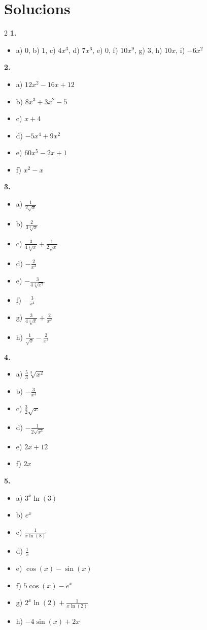 \documentclass[12pt,a4paper]{article}
\begin{document}
\section*{Solucions}
\begin{multicols}{2}
\textbf{1.}
\begin{itemize}[itemsep=0pt]
    \item a) $0$, b) $1$, c) $4x^3$, d) $7x^6$, e) $0$, f) $10x^9$, g) $3$, h) $10x$, i) $-6x^2$
\end{itemize}

\textbf{2.}
\begin{itemize}[itemsep=0pt]
    \item a) $12x^2 - 16x + 12$
    \item b) $8x^3 + 3x^2 - 5$
    \item c) $x + 4$
    \item d) $-5x^4 + 9x^2$
    \item e) $60x^5 - 2x + 1$
    \item f) $x^2 - x$
\end{itemize}

\textbf{3.}
\begin{itemize}[itemsep=0pt]
    \item a) $\frac{1}{2\sqrt{x}}$
    \item b) $\frac{2}{3\sqrt[3]{x}}$
    \item c) $\frac{3}{4\sqrt[4]{x}} + \frac{1}{2\sqrt{x}}$
    \item d) $-\frac{2}{x^3}$
    \item e) $-\frac{3}{4\sqrt[4]{x^7}}$
    \item f) $-\frac{3}{x^4}$
    \item g) $\frac{3}{4\sqrt[4]{x}} + \frac{2}{x^2}$
    \item h) $\frac{1}{\sqrt{x}} - \frac{2}{x^3}$
\end{itemize}

\textbf{4.}
\begin{itemize}[itemsep=0pt]
    \item a) $\frac{5}{3}\sqrt[3]{x^2}$
    \item b) $-\frac{3}{x^4}$
    \item c) $\frac{3}{2}\sqrt{x}$
    \item d) $-\frac{1}{2\sqrt{x^3}}$
    \item e) $2x + 12$
    \item f) $2x$
\end{itemize}

\textbf{5.}
\begin{itemize}[itemsep=0pt]
    \item a) $3^x \ln(3)$
    \item b) $e^x$
    \item c) $\frac{1}{x \ln(8)}$
    \item d) $\frac{1}{x}$
    \item e) $\cos(x) - \sin(x)$
    \item f) $5\cos(x) - e^x$
    \item g) $2^x \ln(2) + \frac{1}{x \ln(2)}$
    \item h) $-4\sin(x) + 2x$
\end{itemize}
\end{multicols}
\end{document}
